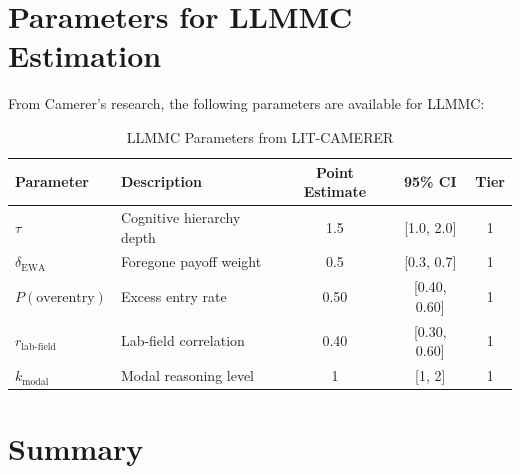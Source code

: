\section{Parameters for LLMMC Estimation}
\label{sec:ca-llmmc}

From Camerer's research, the following parameters are available for LLMMC:

\begin{table}[htbp]
\centering
\caption{LLMMC Parameters from LIT-CAMERER}
\label{tab:ca-llmmc}
\renewcommand{\arraystretch}{1.3}
\begin{tabular}{@{}llccc@{}}
\toprule
\textbf{Parameter} & \textbf{Description} & \textbf{Point Estimate} & \textbf{95\% CI} & \textbf{Tier} \\
\midrule
$\tau$ & Cognitive hierarchy depth & 1.5 & [1.0, 2.0] & 1 \\
$\delta_{\text{EWA}}$ & Foregone payoff weight & 0.5 & [0.3, 0.7] & 1 \\
$P(\text{overentry})$ & Excess entry rate & 0.50 & [0.40, 0.60] & 1 \\
$r_{\text{lab-field}}$ & Lab-field correlation & 0.40 & [0.30, 0.60] & 1 \\
$k_{\text{modal}}$ & Modal reasoning level & 1 & [1, 2] & 1 \\
\bottomrule
\end{tabular}
\end{table}


\section{Summary}
\label{sec:ca-summary}


